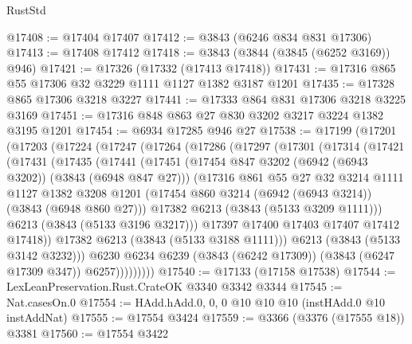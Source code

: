 \begin{lexlean}{RustStd}
\begin{coremodule}
@17408 := @17404 @17407
@17412 := @3843 (@6246 @834 @831 @17306)
@17413 := @17408 @17412
@17418 := @3843 (@3844 (@3845 (@6252 @3169)) @946)
@17421 := @17326 (@17332 (@17413 @17418))
@17431 := @17316 @865 @55 @17306 @32 @3229 @1111 @1127 @1382 @3187 @1201
@17435 := @17328 @865 @17306 @3218 @3227
@17441 := @17333 @864 @831 @17306 @3218 @3225 @3169
@17451 := @17316 @848 @863 @27 @830 @3202 @3217 @3224 @1382 @3195 @1201
@17454 := @6934 @17285 @946 @27
@17538 := @17199
    (@17201
      (@17203
        (@17224
          (@17247
            (@17264
              (@17286
                (@17297
                  (@17301
                    (@17314
                      (@17421
                        (@17431
                          (@17435
                            (@17441
                              (@17451
                                (@17454 @847 @3202 (@6942 (@6943 @3202)) (@3843 (@6948 @847 @27)))
                                (@17316
                                  @861
                                  @55
                                  @27
                                  @32
                                  @3214
                                  @1111
                                  @1127
                                  @1382
                                  @3208
                                  @1201
                                  (@17454 @860 @3214 (@6942 (@6943 @3214)) (@3843 (@6948 @860 @27)))
                                  @17382
                                  @6213
                                  (@3843 (@5133 @3209 @1111)))
                                @6213
                                (@3843 (@5133 @3196 @3217)))
                              @17397
                              @17400
                              @17403
                              @17407
                              @17412
                              @17418))
                          @17382
                          @6213
                          (@3843 (@5133 @3188 @1111)))
                        @6213
                        (@3843 (@5133 @3142 @3232)))
                      @6230
                      @6234
                      @6239
                      (@3843 (@6242 @17309))
                      (@3843 (@6247 @17309 @347))
                      @6257)))))))))
@17540 := @17133 (@17158 @17538)
@17544 := LexLeanPreservation.Rust.CrateOK @3340 @3342 @3344
@17545 := Nat.casesOn.{0}
@17554 := HAdd.hAdd.{0, 0, 0} @10 @10 @10 (instHAdd.{0} @10 instAddNat)
@17555 := @17554 @3424
@17559 := @3366 (@3376 (@17555 @18)) @3381
@17560 := @17554 @3422

\end{coremodule}
\end{lexlean}
